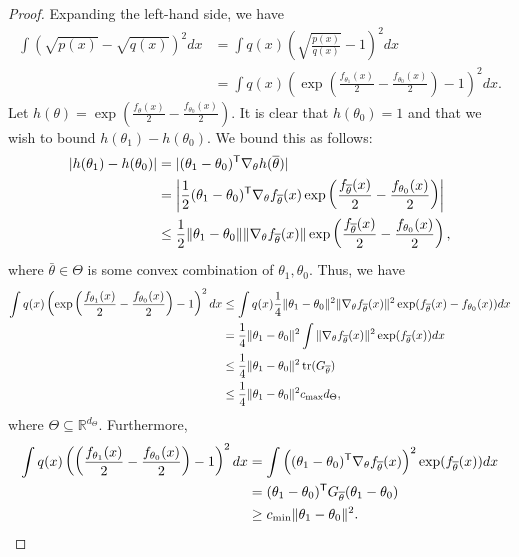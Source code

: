 \documentclass{article}
\begin{document}
\begin{proof}
Expanding the left-hand side, we have
\begin{align*}
\int (\sqrt{p(x)} - \sqrt{q(x)})^2 dx & = \int q(x) \left(
        \sqrt{ \frac{p(x)}{q(x)} } - 1 \right)^2 dx \\
&= \int q(x)
       \left( \exp\left(\frac{f_{\theta_1}(x)}{2} - \frac{f_{\theta_0}(x)}{2} \right) - 1 \right)^2 dx.
\end{align*}
Let $h(\theta) = \exp\left(\frac{f_{\theta}(x)}{2} - \frac{f_{\theta_0}(x)}{2}\right)$. It is clear that $h(\theta_0) = 1$ and that we wish to bound $h(\theta_1) - h(\theta_0)$. We bound this as follows:
\begin{align*}
|h(\theta_1) - h(\theta_0)| &= |(\theta_1 - \theta_0)^{\mathsf{T}} \nabla_{\theta} h(\overline{\theta})| \\
   &= \left |\frac{1}{2} (\theta_1 - \theta_0)^{\mathsf{T}} \nabla_{\theta} f_{\overline{\theta}}(x) 
             \exp\left(\frac{f_{\overline{\theta}}(x)}{2} - \frac{f_{\theta_0}(x)}{2}\right) \right|\\
&\leq \frac{1}{2} \| \theta_1 - \theta_0 \| 
                  \| \nabla_{\theta} f_{\overline{\theta}}(x) \| \exp\left(\frac{f_{\overline{\theta}}(x)}{2} - \frac{f_{\theta_0}(x)}{2}\right), 
\end{align*}
where $\bar{\theta} \in \Theta$ is some convex combination of $\theta_1, \theta_0$. Thus, we have
\begin{align*}
\int q(x)
       \left(\exp\left(\frac{f_{\theta_1}(x)}{2} - \frac{f_{\theta_0}(x)}{2}\right) - 1\right)^2 dx 
  &\leq 
  \int q(x) \frac{1}{4} \| \theta_1 - \theta_0 \|^2 \| \nabla_{\theta} f_{\overline{\theta}}(x) \|^2 
               \exp( f_{\overline{\theta}}(x) - f_{\theta_0}(x)) dx \\
  &= \frac{1}{4} \| \theta_1 - \theta_0 \|^2 \int  \| \nabla_{\theta} f_{\overline{\theta}}(x) \|^2  
            \exp( f_{\overline{\theta}} (x)) d x \\
  &\leq \frac{1}{4}  \| \theta_1 - \theta_0 \|^2 \mathop{\text{tr}}( G_{\overline{\theta}} ) \\
  &\leq \frac{1}{4}  \| \theta_1 - \theta_0 \|^2 c_{\max} d_{\Theta},
\end{align*}
where $\Theta \subseteq \mathbb R^{d_\Theta}$. Furthermore,
\begin{align*}
\int q(x)
       \left(\left(\frac{f_{\theta_1}(x)}{2} - \frac{f_{\theta_0}(x)}{2} \right) - 1 \right)^2 dx 
   &= \int \Big( (\theta_1 - \theta_0)^{\mathsf{T}} \nabla_{\theta} f_{\overline{\theta}}(x) \Big)^2 
               \exp(f_{\overline{\theta}}(x))  dx \\
   &= (\theta_1 - \theta_0)^{\mathsf{T}} G_{\overline{\theta}} (\theta_1 - \theta_0)  \\
   &\geq c_{\min} \| \theta_1 - \theta_0 \|^2.
\end{align*}
\end{proof}
\end{document}

